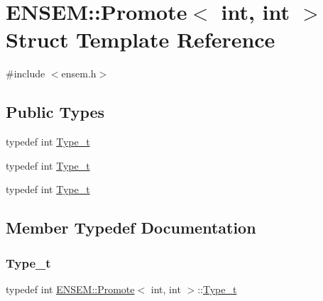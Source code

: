\hypertarget{structENSEM_1_1Promote_3_01int_00_01int_01_4}{}\section{E\+N\+S\+EM\+:\+:Promote$<$ int, int $>$ Struct Template Reference}
\label{structENSEM_1_1Promote_3_01int_00_01int_01_4}


{\ttfamily \#include $<$ensem.\+h$>$}

\subsection*{Public Types}
\begin{DoxyCompactItemize}
\item 
typedef int \mbox{\hyperlink{structENSEM_1_1Promote_3_01int_00_01int_01_4_ad314c2e73c9d5431718e02d851a4322b}{Type\+\_\+t}}
\item 
typedef int \mbox{\hyperlink{structENSEM_1_1Promote_3_01int_00_01int_01_4_ad314c2e73c9d5431718e02d851a4322b}{Type\+\_\+t}}
\item 
typedef int \mbox{\hyperlink{structENSEM_1_1Promote_3_01int_00_01int_01_4_ad314c2e73c9d5431718e02d851a4322b}{Type\+\_\+t}}
\end{DoxyCompactItemize}


\subsection{Member Typedef Documentation}
\mbox{\label{structENSEM_1_1Promote_3_01int_00_01int_01_4_ad314c2e73c9d5431718e02d851a4322b}} 
\subsubsection{\texorpdfstring{Type\_t}{Type\_t}\hspace{0.1cm}{\footnotesize\ttfamily [1/3]}}
{\footnotesize\ttfamily typedef int \mbox{\hyperlink{structENSEM_1_1Promote}{E\+N\+S\+E\+M\+::\+Promote}}$<$ int, int $>$\+::\mbox{\hyperlink{structENSEM_1_1Promote_3_01int_00_01int_01_4_ad314c2e73c9d5431718e02d851a4322b}{Type\+\_\+t}}}

\mbox{\label{structENSEM_1_1Promote_3_01int_00_01int_01_4_ad314c2e73c9d5431718e02d851a4322b}} 
